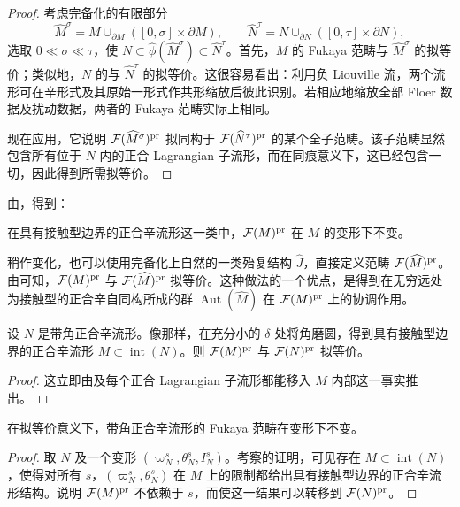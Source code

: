 \begin{proof}
考虑完备化的有限部分
\[
\widehat M^\sigma=M\cup_{\partial M}([0,\sigma]\times\partial M),\qquad
\widehat N^\tau=N\cup_{\partial N}([0,\tau]\times\partial N),
\]
选取 $0\ll\sigma\ll\tau$，使 $N\subset\widehat\phi(\widehat M^\sigma)\subset\widehat N^\tau$。首先，$M$ 的 Fukaya 范畴与 $\widehat M^\sigma$ 的拟等价；类似地，$N$ 的与 $\widehat N^\tau$ 的拟等价。这很容易看出：利用负 Liouville 流，两个流形可在辛形式及其原始一形式作共形缩放后彼此识别。若相应地缩放全部 Floer 数据及扰动数据，两者的 Fukaya 范畴实际上相同。

现在应用，它说明 $\mathcal F(\widehat M^\sigma)^{\mathrm{pr}}$ 拟同构于 $\mathcal F(\widehat N^\tau)^{\mathrm{pr}}$ 的某个全子范畴。该子范畴显然包含所有位于 $N$ 内的正合 Lagrangian 子流形，而在同痕意义下，这已经包含一切，因此得到所需拟等价。
\end{proof}
由，得到：
\begin{corollary}\label{st:10.7}
在具有接触型边界的正合辛流形这一类中，$\mathcal F(M)^{\mathrm{pr}}$ 在 $M$ 的变形下不变。
\end{corollary}
\begin{note}\label{st:10.8}
稍作变化，也可以使用完备化上自然的一类殆复结构 $\widehat J$，直接定义范畴 $\mathcal F(\widehat M)^{\mathrm{pr}}$。由可知，$\mathcal F(M)^{\mathrm{pr}}$ 与 $\mathcal F(\widehat M)^{\mathrm{pr}}$ 拟等价。这种做法的一个优点，是得到在无穷远处为接触型的正合辛自同构所成的群 $\operatorname{Aut}(\widehat M)$ 在 $\mathcal F(M)^{\mathrm{pr}}$ 上的协调作用。
\end{note}
\begin{corollary}\label{st:10.9}
设 $N$ 是带角正合辛流形。像那样，在充分小的 $\delta$ 处将角磨圆，得到具有接触型边界的正合辛流形 $M\subset\operatorname{int}(N)$。则 $\mathcal F(M)^{\mathrm{pr}}$ 与 $\mathcal F(N)^{\mathrm{pr}}$ 拟等价。
\end{corollary}
\begin{proof}
这立即由及每个正合 Lagrangian 子流形都能移入 $M$ 内部这一事实推出。
\end{proof}
\begin{corollary}\label{st:10.10}
在拟等价意义下，带角正合辛流形的 Fukaya 范畴在变形下不变。
\end{corollary}
\begin{proof}
取 $N$ 及一个变形 $(\varpi_N^s,\theta_N^s,I_N^s)$。考察的证明，可见存在 $M\subset\operatorname{int}(N)$，使得对所有 $s$，$(\varpi_N^s,\theta_N^s)$ 在 $M$ 上的限制都给出具有接触型边界的正合辛流形结构。说明 $\mathcal F(M)^{\mathrm{pr}}$ 不依赖于 $s$，而使这一结果可以转移到 $\mathcal F(N)^{\mathrm{pr}}$。
\end{proof}
